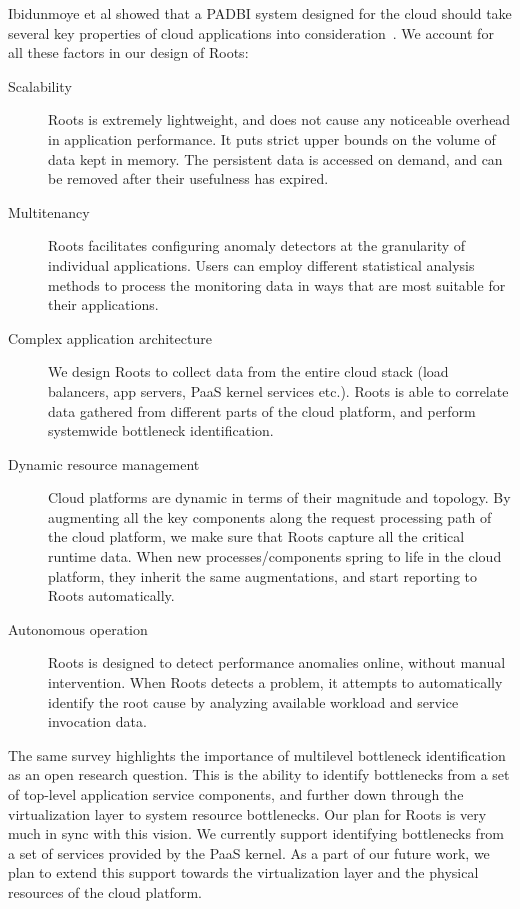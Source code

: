 Ibidunmoye et al showed that a PADBI system designed for the cloud should take several key 
properties of cloud applications into consideration~\cite{Ibidunmoye:2015:PAD:2808687.2791120}. 
We account for all these factors in our design of Roots:
\begin{description}
\item[Scalability] Roots is extremely lightweight, and does not cause any noticeable overhead in 
application performance. It puts strict upper  bounds on the volume of data kept in memory. 
The persistent data is accessed on demand, and can be removed after their usefulness has expired.
\item[Multitenancy] Roots facilitates configuring anomaly detectors at the granularity of individual applications.
Users can employ different statistical analysis methods to process the monitoring data in ways that are 
most suitable for their applications.
\item[Complex application architecture] We design Roots to collect data from the entire cloud stack 
(load balancers, app servers, PaaS kernel services etc.). Roots is able to correlate data gathered
from different parts of the cloud platform, and perform systemwide bottleneck identification.
\item[Dynamic resource management] Cloud platforms are dynamic in terms of their magnitude 
and topology. By augmenting all the key components along the request processing path of the cloud platform,
we make sure that Roots capture all the critical runtime data. When new processes/components
spring to life in the cloud platform, they inherit the same augmentations, and start reporting to Roots automatically.
\item[Autonomous operation] Roots is designed to detect performance anomalies online, without manual intervention.
When Roots detects a problem, it attempts to automatically identify the root cause by analyzing
available workload and service invocation data. 
\end{description}
The same survey highlights the importance of multilevel bottleneck identification as an open research
question. This is the ability to
identify bottlenecks from a set of top-level application service components, and further down through the 
virtualization layer to system resource bottlenecks. Our plan for Roots is very much in sync with this
vision. We currently support identifying bottlenecks from a set of services provided by the PaaS kernel.
As a part of our future work, we plan to extend this support towards the virtualization layer and the
physical resources of the cloud platform.

 